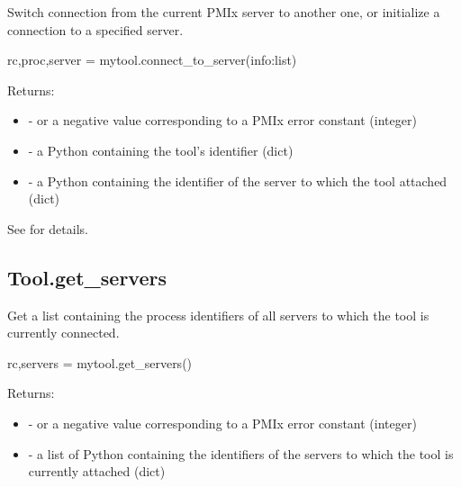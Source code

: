 \summary
Switch connection from the current \ac{PMIx} server to another one, or initialize a connection to a specified server.


\format

\pyspecificstart
\begin{codepar}
rc,proc,server = mytool.connect_to_server(info:list)
\end{codepar}
\pyspecificend


\begin{arglist}
\end{arglist}

Returns:

\begin{itemize}
    \item {} -  or a negative value corresponding to a PMIx error constant (integer)
    \item {} - a Python  containing the tool's identifier (dict)
    \item {} - a Python  containing the identifier of the server to which the tool attached (dict)
\end{itemize}

See  for details.


\subsection{Tool.get_servers}

\summary
Get a list containing the  process identifiers of all servers to which the tool is currently connected.


\format

\pyspecificstart
\begin{codepar}
rc,servers = mytool.get_servers()
\end{codepar}
\pyspecificend

Returns:

\begin{itemize}
    \item {} -  or a negative value corresponding to a PMIx error constant (integer)
    \item {} - a list of Python  containing the identifiers of the servers to which the tool is currently attached (dict)
\end{itemize}

